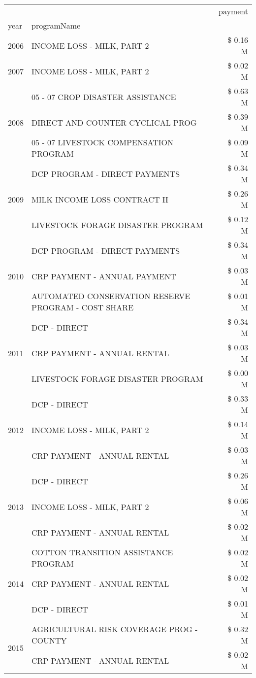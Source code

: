 \begin{tabular}{llr}
\toprule
 &  & payment \\
year & programName &  \\
\midrule
2006 & INCOME LOSS - MILK, PART 2 & \$ 0.16 M \\
\cline{1-3}
2007 & INCOME LOSS - MILK, PART 2 & \$ 0.02 M \\
\cline{1-3}
\multirow[t]{3}{*}{2008} & 05 - 07 CROP DISASTER ASSISTANCE & \$ 0.63 M \\
 & DIRECT AND COUNTER CYCLICAL PROG & \$ 0.39 M \\
 & 05 - 07 LIVESTOCK COMPENSATION PROGRAM & \$ 0.09 M \\
\cline{1-3}
\multirow[t]{3}{*}{2009} & DCP PROGRAM - DIRECT PAYMENTS & \$ 0.34 M \\
 & MILK INCOME LOSS CONTRACT II & \$ 0.26 M \\
 & LIVESTOCK FORAGE DISASTER  PROGRAM & \$ 0.12 M \\
\cline{1-3}
\multirow[t]{3}{*}{2010} & DCP PROGRAM - DIRECT PAYMENTS & \$ 0.34 M \\
 & CRP PAYMENT - ANNUAL PAYMENT & \$ 0.03 M \\
 & AUTOMATED CONSERVATION RESERVE PROGRAM - COST SHARE & \$ 0.01 M \\
\cline{1-3}
\multirow[t]{3}{*}{2011} & DCP - DIRECT & \$ 0.34 M \\
 & CRP PAYMENT - ANNUAL RENTAL & \$ 0.03 M \\
 & LIVESTOCK FORAGE DISASTER PROGRAM & \$ 0.00 M \\
\cline{1-3}
\multirow[t]{3}{*}{2012} & DCP - DIRECT & \$ 0.33 M \\
 & INCOME LOSS - MILK, PART 2 & \$ 0.14 M \\
 & CRP PAYMENT - ANNUAL RENTAL & \$ 0.03 M \\
\cline{1-3}
\multirow[t]{3}{*}{2013} & DCP - DIRECT & \$ 0.26 M \\
 & INCOME LOSS - MILK, PART 2 & \$ 0.06 M \\
 & CRP PAYMENT - ANNUAL RENTAL & \$ 0.02 M \\
\cline{1-3}
\multirow[t]{3}{*}{2014} & COTTON TRANSITION ASSISTANCE PROGRAM & \$ 0.02 M \\
 & CRP PAYMENT - ANNUAL RENTAL & \$ 0.02 M \\
 & DCP - DIRECT & \$ 0.01 M \\
\cline{1-3}
\multirow[t]{3}{*}{2015} & AGRICULTURAL RISK COVERAGE PROG - COUNTY & \$ 0.32 M \\
 & CRP PAYMENT - ANNUAL RENTAL & \$ 0.02 M \\

\end{tabular}
